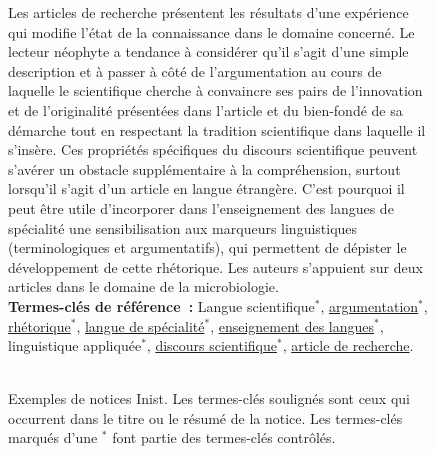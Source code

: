 \begin{figure}
\begin{minipage}{\linewidth}
{{          \vspace{-0.5em}
          Les articles de recherche présentent les résultats d'une expérience
          qui modifie l'état de la connaissance dans le domaine concerné. Le
          lecteur néophyte a tendance à considérer qu'il s'agit d'une simple
          description et à passer à côté de l'argumentation au cours de laquelle
          le scientifique cherche à convaincre ses pairs de l'innovation et de
          l'originalité présentées dans l'article et du bien-fondé de sa
          démarche tout en respectant la tradition scientifique dans laquelle il
          s'insère. Ces propriétés spécifiques du discours scientifique peuvent
          s'avérer un obstacle supplémentaire à la compréhension, surtout
          lorsqu'il s'agit d'un article en langue étrangère. C'est pourquoi il
          peut être utile d'incorporer dans l'enseignement des langues de
          spécialité une sensibilisation aux marqueurs linguistiques
          (terminologiques et argumentatifs), qui permettent de dépister le
          développement de cette rhétorique. Les auteurs s'appuient sur deux
          articles dans le domaine de la microbiologie.\\

          \vspace{-0.5em}
          \textbf{Termes-clés de référence~:} Langue scientifique$^*$,
          \underline{argumentation$^*$},  \underline{rhétorique$^*$}, 
          \underline{langue de spécialité$^*$}, \underline{enseignement des
          langues$^*$}, linguistique appliquée$^*$,  \underline{discours
          scientifique$^*$},  \underline{article de recherche}.
        }
      }
      ~\\~\\
    \end{minipage}
    \caption{Exemples de notices Inist. Les termes-clés soulignés sont ceux qui occurrent dans
             le titre ou le résumé de la notice. Les termes-clés marqués d'une
             $^*$ font partie des termes-clés contrôlés.
             \label{fig:exemple_notice_inist}}
  \end{figure}

